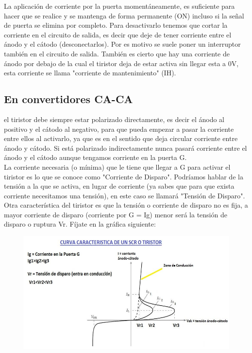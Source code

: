 \documentclass[11pt,a4paper]{article}
\begin{document}
 La aplicación de corriente por la puerta momentáneamente, es suficiente para hacer que se realice y se mantenga de forma permanente (ON) incluso si la señal de puerta se elimina por completo. Para desactivarlo tenemos que cortar la corriente en el circuito de salida, es decir que deje de tener corriente entre el ánodo y el cátodo (desconectarlos). Por es motivo se suele poner un interruptor también en el circuito de salida. También es cierto que hay una corriente de ánodo por debajo de la cual el tiristor deja de estar activa sin llegar esta a 0V, esta corriente se llama "corriente de mantenimiento" (IH).
 
 
 
 
 
 
\subsection{En convertidores CA-CA}
el tiristor debe siempre estar polarizado directamente, es decir el ánodo al positivo y el cátodo al negativo, para que pueda empezar a pasar la corriente entre ellos al activarlo, ya que es en el sentido que deja circular corriente entre ánodo y cátodo. Si está polarizado indirectamente nunca pasará corriente entre el ánodo y el cátodo aunque tengamos corriente en la puerta G.\\

 La corriente necesaria (o mínima) que le tiene que llegar a G para activar el tiristor es lo que se conoce como "Corriente de Disparo". Podríamos hablar de la tensión a la que se activa, en lugar de corriente (ya sabes que para que exista corriente necesitamos una tensión), en este caso se llamará "Tensión de Disparo".\\

 Otra característica del tiristor es que la tensión o corriente de disparo no es fija, a mayor corriente de disparo (corriente por G = Ig) menor será la tensión de disparo o ruptura Vr. Fíjate en la gráfica siguiente:\\
 
\begin{figure}[hbtp]
\centering
\includegraphics[scale=0.40]{DATOS.png}
\end{figure} 
\end{document}
